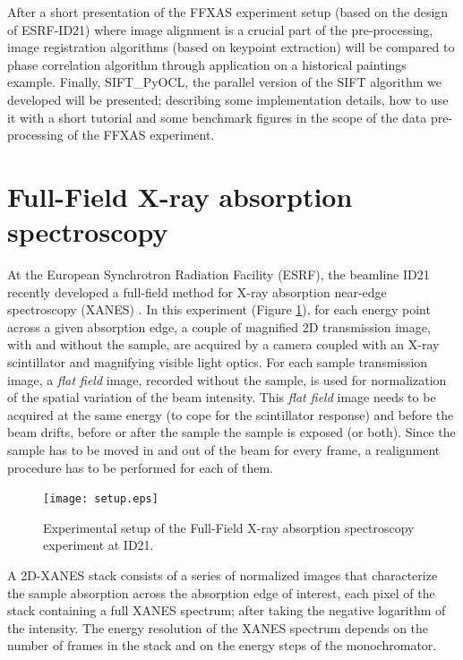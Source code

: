 \documentclass[preprint]{iucr}
\begin{document}
After a short presentation of the FFXAS
experiment setup (based on the design of ESRF-ID21) where image alignment is a
crucial part of the pre-processing, image registration algorithms (based on
keypoint extraction) will be compared to phase correlation algorithm through
application on a historical paintings example.
Finally, SIFT\_PyOCL, the parallel version of the SIFT algorithm  we developed
will be presented; describing some implementation details, how to use it
with a short tutorial and some benchmark figures in the scope of the data
pre-processing of the FFXAS experiment.

\section{Full-Field X-ray absorption spectroscopy}
At the European Synchrotron Radiation Facility (ESRF), the beamline ID21
recently developed a full-field method for X-ray absorption near-edge
spectroscopy (XANES) \cite{andrade,fullfield}.
In this experiment (Figure \ref{setup}), for each energy point across a given
absorption edge, a couple of magnified 2D transmission image, with and
without the sample, are acquired by a camera coupled with an
X-ray scintillator and magnifying visible light optics.
For each sample transmission image, a \emph{flat field} image,
recorded without the sample, is used for normalization of the spatial
variation of the beam intensity. 
This \emph{flat field} image needs to be acquired at the same energy (to cope
for the scintillator response) and before the beam drifts, before or
after the sample the sample is exposed (or both). 
Since the sample has to be moved in and out of the beam for every frame, a 
realignment procedure has to be performed for each of them.

\begin{figure}
\begin{center}
\texttt{[image: setup.eps]}
\caption{\label{setup} Experimental setup of the Full-Field X-ray absorption
spectroscopy experiment at ID21.}
\end{center}
\end{figure}

 A 2D-XANES stack consists of a series of normalized images that
characterize the sample absorption across the absorption edge of interest, each pixel of the
stack containing a full XANES spectrum; after taking the negative logarithm
of the intensity. The energy resolution of the XANES spectrum depends on the
number of frames in the stack and on the energy steps of the monochromator.
\end{document}
